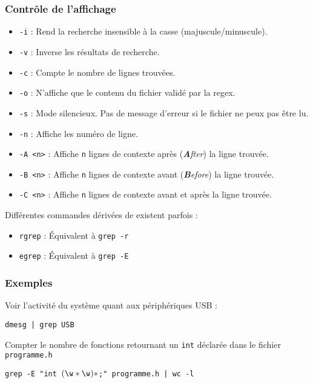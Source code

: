 \subsubsection{Contrôle de l'affichage}
\begin{itemize}
    \item \texttt{-i} : Rend la recherche insensible à la casse (majuscule/minuscule).
    \item \texttt{-v} : Inverse les résultats de recherche.
    \item \texttt{-c} : Compte le nombre de lignes trouvées.
    \item \texttt{-o} : N'affiche que le contenu du fichier validé par la regex.
    \item \texttt{-s} : Mode silencieux. Pas de message d'erreur si le fichier ne peux pas être lu.
    \item \texttt{-n} : Affiche les numéro de ligne.
    \item \texttt{-A <n>} : Affiche \texttt{n} lignes de contexte après (\textit{\textbf{A}fter}) la ligne trouvée.
    \item \texttt{-B <n>} : Affiche \texttt{n} lignes de contexte avant (\textit{\textbf{B}efore}) la ligne trouvée.
    \item \texttt{-C <n>} : Affiche \texttt{n} lignes de contexte avant et après la ligne trouvée.
\end{itemize}

 Différentes commandes dérivées de  existent parfois : 
\begin{itemize}
    \item \texttt{rgrep} : Équivalent à \texttt{grep -r}
    \item \texttt{egrep} : Équivalent à \texttt{grep -E}
\end{itemize}

\subsubsection{Exemples}

Voir l'activité du système quant aux périphériques USB :
\begin{nscenter}
\texttt{dmesg | grep USB}
\end{nscenter}

Compter le nombre de fonctions retournant un \texttt{int} déclarée dans le fichier \texttt{programme.h}
\begin{nscenter}
\texttt{grep -E "int \w \((\w\** \w)*\);" programme.h | wc -l}
\end{nscenter}

